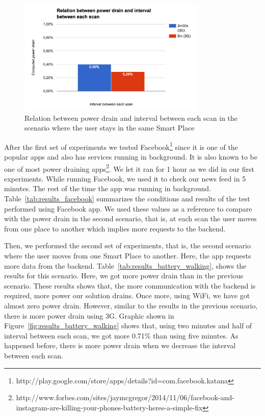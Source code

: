 
\begin{figure}[!ht]
  \centering
    \includegraphics[width=0.8\textwidth, keepaspectratio]{images/results_battery_stopped}
    \caption[Power drain when the user does not move]{Relation between power drain and interval between each scan in the scenario where the user stays in the same Smart Place}
    \label{fig:results_battery_stopped}
\end{figure}

After the first set of experiments we tested Facebook\footnote{http://play.google.com/store/apps/details?id=com.facebook.katana} since it is one of the popular apps and also has services running in background.
It is also known to be one of most power draining apps\footnote{http://www.forbes.com/sites/jaymcgregor/2014/11/06/facebook-and-instagram-are-killing-your-phones-battery-heres-a-simple-fix}.
We let it ran for 1 hour as we did in our first experiments.
While running Facebook, we used it to check our news feed in 5 minutes. The rest of the time the app was running in background.
Table~\ref{tab:results_facebook} summarizes the conditions and results of the test performed using Facebook app.
We used these values as a reference to compare with the power drain in the second scenario, that is, at each scan the user moves from one place to another which implies more requests to the backend.


Then, we performed the second set of experiments, that is, the second scenario where the user moves from one Smart Place to another.
Here, the app requests more data from the backend.
Table~\ref{tab:results_battery_walking}, shows the results for this scenario. Here, we got more power drain than in the previous scenario.
These results shows that, the more communication with the backend is required, more power our solution drains.
Once more, using \gls{WiFi}, we have got almost zero power drain.
However, similar to the results in the previous scenario, there is more power drain using \gls{3G}.
Graphic shown in Figure~\ref{fig:results_battery_walking} shows that, using two minutes and half of interval between each scan, we got more 0.71\% than using five minutes.
As happened before, there is more power drain when we decrease the interval between each scan.

